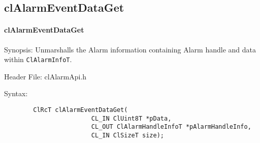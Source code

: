 \begin{flushleft}
\newpage

\subsection{clAlarmEventDataGet}
\hypertarget{pageam103}{}\paragraph{cl\-Alarm\-Event\-Data\-Get}\label{pageam103}
\begin{Desc}
\item[Synopsis:] Unmarshalls the Alarm information containing Alarm handle and data within {\tt{ClAlarmInfoT}}.
\end{Desc}
\begin{Desc}
\item[Header File:]clAlarmApi.h\end{Desc}
\begin{Desc}
\item[Syntax:]

\footnotesize\begin{verbatim}        ClRcT clAlarmEventDataGet(
						CL_IN ClUint8T *pData, 
						CL_OUT ClAlarmHandleInfoT *pAlarmHandleInfo, 
						CL_IN ClSizeT size);


\end{verbatim}
\end{Desc}
\end{flushleft}
